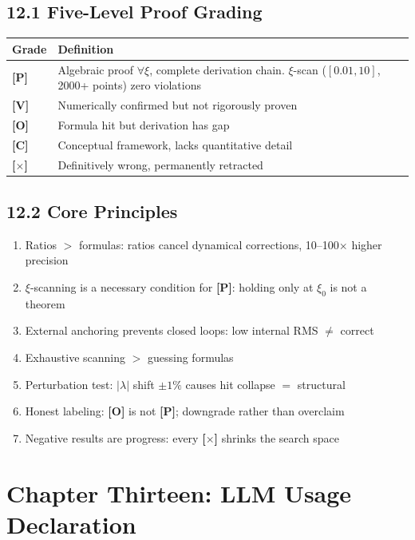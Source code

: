 \documentclass[11pt,a4paper]{article}
\newcommand{\gradeP}{\textbf{[P]}}
\newcommand{\gradeV}{\textbf{[V]}}
\newcommand{\gradeO}{\textbf{[O]}}
\newcommand{\gradeC}{\textbf{[C]}}
\newcommand{\gradeX}{\textbf{[$\times$]}}
\begin{document}
\subsection{12.1 Five-Level Proof Grading}

\begin{center}
\begin{tabular}{ll}
\toprule
Grade & Definition \\
\midrule
\gradeP & Algebraic proof $\forall\xi$, complete derivation chain. $\xi$-scan ($[0.01,10]$, 2000+ points) zero violations \\
\gradeV & Numerically confirmed but not rigorously proven \\
\gradeO & Formula hit but derivation has gap \\
\gradeC & Conceptual framework, lacks quantitative detail \\
\gradeX & Definitively wrong, permanently retracted \\
\bottomrule
\end{tabular}
\end{center}

\subsection{12.2 Core Principles}

\begin{enumerate}[nosep]
\item Ratios $>$ formulas: ratios cancel dynamical corrections, 10--100$\times$ higher precision
\item $\xi$-scanning is a necessary condition for \gradeP: holding only at $\xi_0$ is not a theorem
\item External anchoring prevents closed loops: low internal RMS $\neq$ correct
\item Exhaustive scanning $>$ guessing formulas
\item Perturbation test: $|\lambda|$ shift $\pm 1\%$ causes hit collapse $=$ structural
\item Honest labeling: \gradeO{} is not \gradeP; downgrade rather than overclaim
\item Negative results are progress: every \gradeX{} shrinks the search space
\end{enumerate}

\section{Chapter Thirteen: LLM Usage Declaration}\label{sec:ch13}
\end{document}
